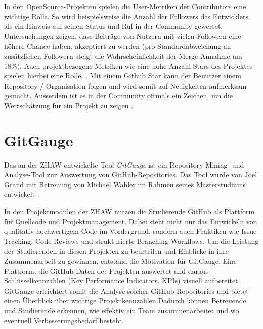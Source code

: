 In den OpenSource-Projekten spielen die User-Metriken der Contributors eine wichtige Rolle. So wird beispielsweise die Anzahl der Followers des Entwicklers als ein Hinweis auf seinen Status und Ruf in der Community gewertet. Untersuchungen zeigen, dass Beiträge von Nutzern mit vielen Followern eine höhere Chance haben, akzeptiert zu werden (pro Standardabweichung an zusätzlichen Followern steigt die Wahrscheinlichkeit der Merge-Annahme um 18\%). Auch projektbezogene Metriken wie eine hohe Anzahl Stars des Projektes spielen hierbei eine Rolle. \parencite{tsay_influence_2014}. Mit einem Github Star kann der Benutzer einem Repository / Organisation folgen und wird somit auf Neuigkeiten aufmerksam gemacht. Ausserdem ist es in der Community oftmals ein Zeichen, um die Wertschätzung für ein Projekt zu zeigen \parencite{noauthor_saving_nodate}.

\section{GitGauge}
Das an der ZHAW entwickelte Tool \textit{GitGauge} ist ein Repository-Mining- und Analyse-Tool zur Auswertung von GitHub-Repositories. Das Tool wurde von Joel Grand mit Betreuung von Michael Wahler im Rahmen seines Masterstudiums entwickelt \parencite{grand_joel_wahler_michael_waspe_lara_stumpf_simon_repo_nodate}.

In den Projektmodulen der ZHAW nutzen die Studierende GitHub als Plattform für Quellcode und Projektmanagement. Dabei steht nicht nur das Entwickeln von qualitativ hochwertigem Code im Vordergrund, sondern auch Praktiken wie Issue-Tracking, Code Reviews und strukturierte Branching-Workflows. Um die Leistung der Studierenden in diesen Projekten zu beurteilen und Einblicke in ihre Zusammenarbeit zu gewinnen, entstand die Motivation für GitGauge. Eine Plattform, die GitHub-Daten der Projekten auswertet und daraus Schlüsselkennzahlen (Key Performance Indicators, KPIs) visuell aufbereitet. GitGauge erleichtert somit die Analyse solcher GitHub-Repositories und bietet einen Überblick über wichtige Projektkennzahlen.Dadurch können Betreuende und Studierende erkennen, wie effektiv ein Team zusammenarbeitet und wo eventuell Verbesserungsbedarf besteht. \parencite{grand_joel_vt1_joelgrand_repository_2024}

